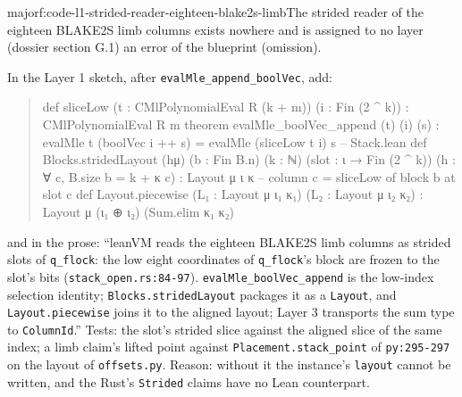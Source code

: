 \begin{finding}{major}{f:code-l1-strided-reader-eighteen-blake2s-limb}{The strided reader of the eighteen BLAKE2S limb columns exists nowhere and is assigned to no layer (dossier section G.1)}
an error of the blueprint (omission).

In the Layer 1 sketch, after \texttt{evalMle\_\allowbreak{}append\_\allowbreak{}boolVec}, add:

\begin{quote}
\begin{leancode}
def sliceLow (t : CMlPolynomialEval R (k + m)) (i : Fin (2 ^ k)) : CMlPolynomialEval R m
theorem evalMle_boolVec_append (t) (i) (s) : evalMle t (boolVec i ++ s) = evalMle (sliceLow t i) s
-- Stack.lean
def Blocks.stridedLayout (hμ) (b : Fin B.n) (k : ℕ) (slot : ι → Fin (2 ^ k))
    (h : ∀ c, B.size b = k + κ c) : Layout μ ι κ       -- column c = sliceLow of block b at slot c
def Layout.piecewise (L₁ : Layout μ ι₁ κ₁) (L₂ : Layout μ ι₂ κ₂) : Layout μ (ι₁ ⊕ ι₂) (Sum.elim κ₁ κ₂)
\end{leancode}
\end{quote}

and in the prose: \enquote{leanVM reads the eighteen BLAKE2S limb columns as strided slots of \texttt{q\_\allowbreak{}flock}: the low eight coordinates of \texttt{q\_\allowbreak{}flock}'s block are frozen to the slot's bits (\texttt{stack\_\allowbreak{}open.\allowbreak{}rs:84-{}97}). \texttt{evalMle\_\allowbreak{}boolVec\_\allowbreak{}append} is the low-index selection identity; \texttt{Blocks.\allowbreak{}stridedLayout} packages it as a \texttt{Layout}, and \texttt{Layout.\allowbreak{}piecewise} joins it to the aligned layout; Layer 3 transports the sum type to \texttt{ColumnId}.} Tests: the slot's strided slice against the aligned slice of the same index; a limb claim's lifted point against \texttt{Placement.\allowbreak{}stack\_\allowbreak{}point} of \texttt{py:295-{}297} on the layout of \texttt{offsets.\allowbreak{}py}. Reason: without it the instance's \texttt{layout} cannot be written, and the Rust's \texttt{Strided} claims have no Lean counterpart.

\end{finding}

